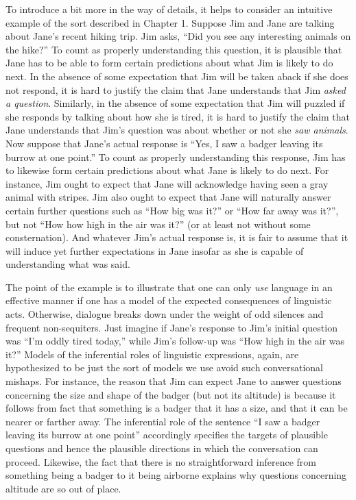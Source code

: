 To introduce a bit more in the way of details, it helps to consider an intuitive example of the sort described in Chapter 1. Suppose Jim and Jane are talking about Jane's recent hiking trip. Jim asks, ``Did you see any interesting animals on the hike?'' To count as properly understanding this question, it is plausible that Jane has to be able to form certain predictions about what Jim is likely to do next. In the absence of some expectation that Jim will be taken aback if she does not respond, it is hard to justify the claim that Jane understands that Jim \textit{asked a question}. Similarly, in the absence of some expectation that Jim will puzzled if she responds by talking about how she is tired, it is hard to justify the claim that Jane understands that Jim's question was about whether or not she \textit{saw animals}. Now suppose that Jane's actual response is ``Yes, I saw a badger leaving its burrow at one point.'' To count as properly understanding this response, Jim has to likewise form certain predictions about what Jane is likely to do next. For instance, Jim ought to expect that Jane will acknowledge having seen a gray animal with stripes. Jim also ought to expect that Jane will naturally answer certain further questions such as ``How big was it?'' or ``How far away was it?'', but not ``How how high in the air was it?'' (or at least not without some consternation). And whatever Jim's actual response is, it is fair to assume that it will induce yet further expectations in Jane insofar as she is capable of understanding what was said. 

The point of the example is to illustrate that one can only \textit{use} language in an effective manner if one has a model of the expected consequences of linguistic acts. Otherwise, dialogue breaks down under the weight of odd silences and frequent non-sequiters. Just imagine if Jane's response to Jim's initial question was ``I'm oddly tired today,'' while Jim's follow-up was ``How high in the air was it?'' Models of the inferential roles of linguistic expressions, again, are hypothesized to be just the sort of models we use avoid such conversational mishaps. For instance, the reason that Jim can expect Jane to answer questions concerning the size and shape of the badger (but not its altitude) is because it follows from fact that something is a badger that it has a size, and that it can be nearer or farther away. The inferential role of the sentence ``I saw a badger leaving its burrow at one point'' accordingly specifies the targets of plausible questions and hence the plausible directions in which the conversation can proceed. Likewise, the fact that there is no straightforward inference from something being a badger to it being airborne explains why questions concerning altitude are so out of place.

